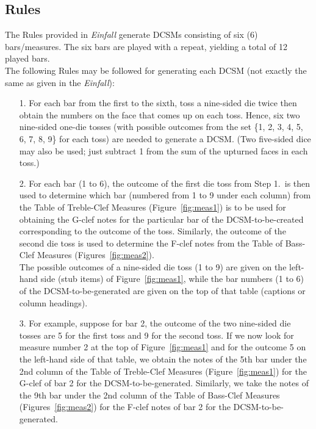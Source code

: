 \documentclass[a4paper,x11names,svgnames,10pt]{article}
\begin{document}
{\subsection{Rules}

The Rules provided in {\em Einfall} generate DCSMs consisting of six (6) bars/measures.  The six bars are played with a repeat, yielding a total of 12 played bars. \\

The following Rules may be followed for generating each DCSM (not exactly the same as given in the {\it Einfall}):
\begin{enumerate}
	\item [1.] For each bar from the first to the sixth, toss a nine-sided die twice then obtain the numbers on the face that comes up on each toss.  Hence, six two nine-sided one-die tosses (with possible outcomes from the set \{1, 2, 3, 4, 5, 6, 7, 8, 9\} for each toss) are needed to generate a DCSM. (Two five-sided dice may also be used; just subtract 1 from the sum of the upturned faces in each toss.)
	\item [2.] For each bar (1 to 6), the outcome of the first die toss from Step 1.\ is then used to determine which bar (numbered from 1 to 9 under each column) from the Table of Treble-Clef Measures (Figure~\ref{fig:meas1}) is to be used for obtaining the G-clef notes for the particular bar of the DCSM-to-be-created corresponding to the outcome of the toss.  Similarly, the outcome of the second die toss is used to determine the F-clef notes from the Table of Bass-Clef Measures (Figures~\ref{fig:meas2}).  \\
	The possible outcomes of a nine-sided die toss (1 to 9) are given on the left-hand side (stub items) of Figure~\ref{fig:meas1}, while the bar numbers (1 to 6) of the DCSM-to-be-generated are given on the top of that table (captions or column  headings).
	\item [3.]  For example, suppose for bar 2, the outcome of the two nine-sided die tosses are 5 for the first toss and 9 for the second toss.  If we now look for measure number 2 at the top of Figure~\ref{fig:meas1} and for the outcome 5 on the left-hand side of that table, we obtain the notes of the 5th bar under the 2nd column of the Table of Treble-Clef Measures (Figure~\ref{fig:meas1}) for the G-clef of bar 2 for the DCSM-to-be-generated.  Similarly, we take the notes of the 9th bar under the 2nd column of the Table of Bass-Clef Measures (Figures~\ref{fig:meas2}) for the F-clef notes of bar 2 for the DCSM-to-be-generated.
\end{enumerate}   


}
\end{document}
